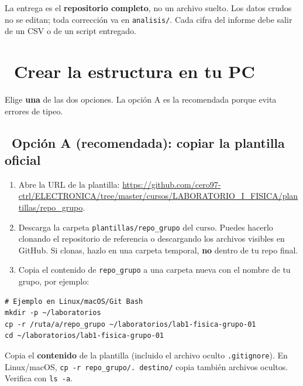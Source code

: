 \documentclass[11pt,a4paper]{article}
\newcommand{\iconotexto}[2]{\textcolor{cyanNeon}{\faIcon{#1}}~#2}
\begin{document}
\begin{tcolorbox}[cajaRecomendacion,title={\faIcon{info-circle}~Regla de oro}]
La entrega es el \textbf{repositorio completo}, no un archivo suelto. Los datos crudos no se editan; toda corrección va en \texttt{analisis/}. Cada cifra del informe debe salir de un CSV o de un script entregado.
\end{tcolorbox}

\section{\iconotexto{laptop-code}{Crear la estructura en tu PC}}

Elige \textbf{una} de las dos opciones. La opción A es la recomendada porque evita errores de tipeo.

\subsection{\iconotexto{copy}{Opción A (recomendada): copiar la plantilla oficial}}

\begin{enumerate}[leftmargin=1.6em,itemsep=4pt,topsep=2pt]
  \item Abre la URL de la plantilla: \url{https://github.com/cero97-ctrl/ELECTRONICA/tree/master/cursos/LABORATORIO_I_FISICA/plantillas/repo_grupo}.
  \item Descarga la carpeta \texttt{plantillas/repo\_grupo} del curso. Puedes hacerlo clonando el repositorio de referencia o descargando los archivos visibles en GitHub. Si clonas, hazlo en una carpeta temporal, \textbf{no} dentro de tu repo final.
  \item Copia el contenido de \texttt{repo\_grupo} a una carpeta nueva con el nombre de tu grupo, por ejemplo:
\end{enumerate}

\begin{lstlisting}
# Ejemplo en Linux/macOS/Git Bash
mkdir -p ~/laboratorios
cp -r /ruta/a/repo_grupo ~/laboratorios/lab1-fisica-grupo-01
cd ~/laboratorios/lab1-fisica-grupo-01
\end{lstlisting}

\begin{cajaRecuerda}
Copia el \textbf{contenido} de la plantilla (incluido el archivo oculto \texttt{.gitignore}). En Linux/macOS, \texttt{cp -r repo\_grupo/. destino/} copia también archivos ocultos. Verifica con \texttt{ls -a}.
\end{cajaRecuerda}
\end{document}
